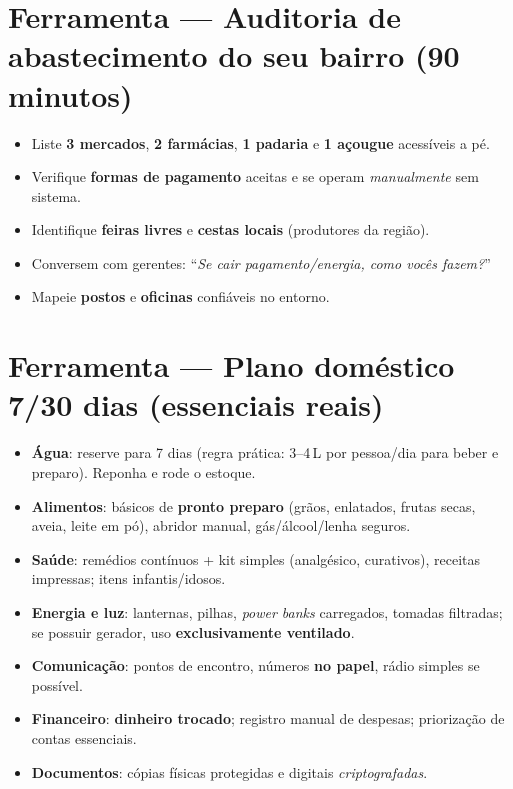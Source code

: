 \section{Ferramenta --- Auditoria de abastecimento do seu bairro (90 minutos)}
\begin{checklist}
\begin{itemize}[leftmargin=*,noitemsep]
  \item Liste \textbf{3 mercados}, \textbf{2 farmácias}, \textbf{1 padaria} e \textbf{1 açougue} acessíveis a pé.
  \item Verifique \textbf{formas de pagamento} aceitas e se operam \emph{manualmente} sem sistema.
  \item Identifique \textbf{feiras livres} e \textbf{cestas locais} (produtores da região).
  \item Conversem com gerentes: ``\emph{Se cair pagamento/energia, como vocês fazem?}''
  \item Mapeie \textbf{postos} e \textbf{oficinas} confiáveis no entorno.
\end{itemize}
\end{checklist}

\section{Ferramenta --- Plano doméstico 7/30 dias (essenciais reais)}
\begin{checklist}[title={Itens e hábitos},breakable]
\begin{itemize}[leftmargin=*,noitemsep]
  \item \textbf{Água}: reserve para 7 dias (regra prática: 3--4\,L por pessoa/dia para beber e preparo). Reponha e rode o estoque.
  \item \textbf{Alimentos}: básicos de \textbf{pronto preparo} (grãos, enlatados, frutas secas, aveia, leite em pó), abridor manual, gás/álcool/lenha seguros.
  \item \textbf{Saúde}: remédios contínuos + kit simples (analgésico, curativos), receitas impressas; itens infantis/idosos.
  \item \textbf{Energia e luz}: lanternas, pilhas, \emph{power banks} carregados, tomadas filtradas; se possuir gerador, uso \textbf{exclusivamente ventilado}.
  \item \textbf{Comunicação}: pontos de encontro, números \textbf{no papel}, rádio simples se possível.
  \item \textbf{Financeiro}: \textbf{dinheiro trocado}; registro manual de despesas; priorização de contas essenciais.
  \item \textbf{Documentos}: cópias físicas protegidas e digitais \emph{criptografadas}.
\end{itemize}
\end{checklist}

